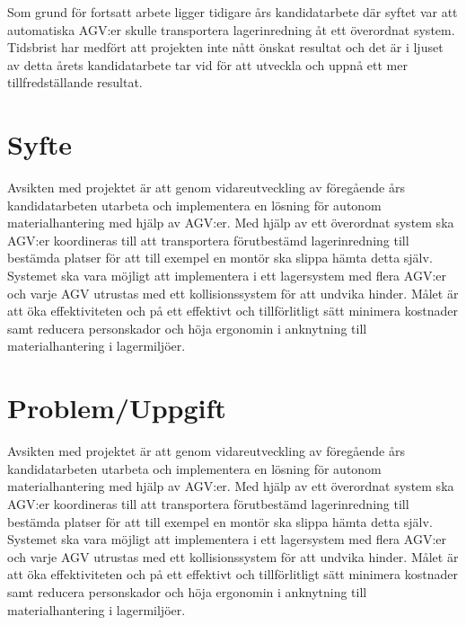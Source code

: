 \documentclass[a4paper,11pt]{article}
\begin{document}
Som grund för fortsatt arbete ligger tidigare års kandidatarbete där syftet
var att automatiska AGV:er skulle transportera lagerinredning åt ett
överordnat system\cite{qr,laser}. Tidsbrist har medfört att projekten inte
nått önskat resultat och det är i ljuset av detta årets kandidatarbete tar
vid för att utveckla och uppnå ett mer tillfredställande resultat. 


\section{Syfte}
Avsikten med projektet är att genom vidareutveckling av föregående års
kandidatarbeten utarbeta och implementera en lösning för autonom
materialhantering med hjälp av AGV:er. Med hjälp av ett överordnat system
ska AGV:er koordineras till att transportera förutbestämd lagerinredning
till bestämda platser för att till exempel en montör ska slippa hämta detta
själv. Systemet ska vara möjligt att implementera i ett lagersystem med
flera AGV:er och varje AGV utrustas med ett kollisionssystem för att
undvika hinder. Målet är att öka effektiviteten och på ett effektivt och
tillförlitligt sätt minimera kostnader samt reducera personskador och höja
ergonomin i anknytning till materialhantering i lagermiljöer. 


\section{Problem/Uppgift}
Avsikten med projektet är att genom vidareutveckling av föregående års
kandidatarbeten utarbeta och implementera en lösning för autonom
materialhantering med hjälp av AGV:er. Med hjälp av ett överordnat system
ska AGV:er koordineras till att transportera förutbestämd lagerinredning
till bestämda platser för att till exempel en montör ska slippa hämta detta
själv. Systemet ska vara möjligt att implementera i ett lagersystem med
flera AGV:er och varje AGV utrustas med ett kollisionssystem för att
undvika hinder. Målet är att öka effektiviteten och på ett effektivt och
tillförlitligt sätt minimera kostnader samt reducera personskador och höja
ergonomin i anknytning till materialhantering i lagermiljöer. 
\end{document}
